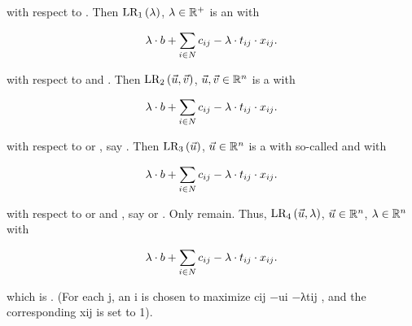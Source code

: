 \begin{optionenum}
 \item {} with respect to . Then $\fun{\mbox{LR}_1}{\lambda}$, $\lambda\in\RRR^+$ is an  with 
 
 \begin{equation}
 \lambda\cdot b+\sumdomain[i]{N}{c_{ij}-\lambda\cdot t_{ij}}\cdot x_{ij}.
 \end{equation}

 \item {} with respect to  and . Then $\fun{\mbox{LR}_2}{\vec{u},\vec{v}}$, $\vec{u},\vec{v}\in\RRR^n$ is a  with 

 \begin{equation}
 \lambda\cdot b+\sumdomain[i]{N}{c_{ij}-\lambda\cdot t_{ij}}\cdot x_{ij}.
 \end{equation}

 \item {} with respect to  or , say . Then $\fun{\mbox{LR}_3}{\vec{u}}$, $\vec{u}\in\RRR^n$ is a  with so-called  and with 

 \begin{equation}
 \lambda\cdot b+\sumdomain[i]{N}{c_{ij}-\lambda\cdot t_{ij}}\cdot x_{ij}.
 \end{equation}

 \item {} with respect to  or  and , say  or . Only  remain. Thus, $\fun{\mbox{LR}_4}{\vec{u},\lambda}$, $\vec{u}\in\RRR^n$, $\lambda\in\RRR^n$ with 

 \begin{equation}
 \lambda\cdot b+\sumdomain[i]{N}{c_{ij}-\lambda\cdot t_{ij}}\cdot x_{ij}.
 \end{equation}

which is . (For each j, an i is chosen to maximize cij −ui −λtij , and the corresponding
xij is set to 1).
\end{optionenum}

